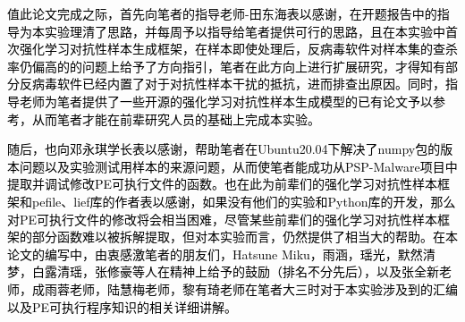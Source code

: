 
\begin{acknowledgements}

\textcolor{black}{值此论文完成之际，首先向笔者的指导老师-田东海表以感谢，在开题报告中的指导为本实验理清了思路，并每周予以指导给笔者提供可行的思路，且在本实验中首次强化学习对抗性样本生成框架，在样本即使处理后，反病毒软件对样本集的查杀率仍偏高的的问题上给予了方向指引，笔者在此方向上进行扩展研究，才得知有部分反病毒软件已经内置了对于对抗性样本干扰的抵抗，进而排查出原因。同时，指导老师为笔者提供了一些开源的强化学习对抗性样本生成模型的已有论文予以参考，从而笔者才能在前辈研究人员的基础上完成本实验。}

\textcolor{black}{随后，也向邓永琪学长表以感谢，帮助笔者在Ubuntu20.04下解决了numpy包的版本问题以及实验测试用样本的来源问题，从而使笔者能成功从PSP-Malware项目中提取并调试修改PE可执行文件的函数。也在此为前辈们的强化学习对抗性样本框架和pefile、lief库的作者表以感谢，如果没有他们的实验和Python库的开发，那么对PE可执行文件的修改将会相当困难，尽管某些前辈们的强化学习对抗性样本框架的部分函数难以被拆解提取，但对本实验而言，仍然提供了相当大的帮助。在本论文的编写中，由衷感激笔者的朋友们，Hatsune Miku，雨涵，瑶光，默然清梦，白露清瑶，张修豪等人在精神上给予的鼓励（排名不分先后），以及张全新老师，成雨蓉老师，陆慧梅老师，黎有琦老师在笔者大三时对于本实验涉及到的汇编以及PE可执行程序知识的相关详细讲解。}

\end{acknowledgements}
